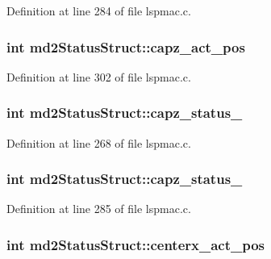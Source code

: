 Definition at line 284 of file lspmac.\-c.

\hypertarget{structmd2StatusStruct_a257c04efac3a33d5d34b21d64c6f1266}{
\subsubsection[{capz\-\_\-act\-\_\-pos}]{\setlength{\rightskip}{0pt plus 5cm}int md2\-Status\-Struct\-::capz\-\_\-act\-\_\-pos}}\label{structmd2StatusStruct_a257c04efac3a33d5d34b21d64c6f1266}


Definition at line 302 of file lspmac.\-c.

\hypertarget{structmd2StatusStruct_a719db4477f35331eaa8b7b44150e88a2}{
\subsubsection[{capz\-\_\-status\-\_\-1}]{\setlength{\rightskip}{0pt plus 5cm}int md2\-Status\-Struct\-::capz\-\_\-status\-\_}}\label{structmd2StatusStruct_a719db4477f35331eaa8b7b44150e88a2}


Definition at line 268 of file lspmac.\-c.

\hypertarget{structmd2StatusStruct_a3abb998bb89433aed16121d0dae6275a}{
\subsubsection[{capz\-\_\-status\-\_\-2}]{\setlength{\rightskip}{0pt plus 5cm}int md2\-Status\-Struct\-::capz\-\_\-status\-\_}}\label{structmd2StatusStruct_a3abb998bb89433aed16121d0dae6275a}


Definition at line 285 of file lspmac.\-c.

\hypertarget{structmd2StatusStruct_ae7924b6e91e1de82f6f7910cb3a9c9bd}{
\subsubsection[{centerx\-\_\-act\-\_\-pos}]{\setlength{\rightskip}{0pt plus 5cm}int md2\-Status\-Struct\-::centerx\-\_\-act\-\_\-pos}}\label{structmd2StatusStruct_ae7924b6e91e1de82f6f7910cb3a9c9bd}


